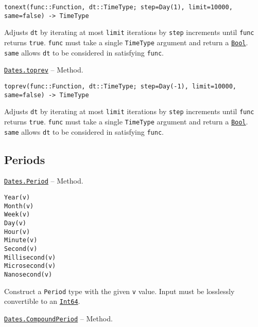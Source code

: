 \begin{adjustwidth}{2em}{0pt}


\begin{verbatim}
tonext(func::Function, dt::TimeType; step=Day(1), limit=10000, same=false) -> TimeType
\end{verbatim}

Adjusts \texttt{dt} by iterating at most \texttt{limit} iterations by \texttt{step} increments until \texttt{func} returns \texttt{true}. \texttt{func} must take a single \texttt{TimeType} argument and return a \hyperlink{46725311238864537}{\texttt{Bool}}. \texttt{same} allows \texttt{dt} to be considered in satisfying \texttt{func}.



\end{adjustwidth}
\hypertarget{7889720794479911439}{} 
\hyperlink{7889720794479911439}{\texttt{Dates.toprev}}  -- {Method.}

\begin{adjustwidth}{2em}{0pt}


\begin{verbatim}
toprev(func::Function, dt::TimeType; step=Day(-1), limit=10000, same=false) -> TimeType
\end{verbatim}

Adjusts \texttt{dt} by iterating at most \texttt{limit} iterations by \texttt{step} increments until \texttt{func} returns \texttt{true}. \texttt{func} must take a single \texttt{TimeType} argument and return a \hyperlink{46725311238864537}{\texttt{Bool}}. \texttt{same} allows \texttt{dt} to be considered in satisfying \texttt{func}.



\end{adjustwidth}

\hypertarget{5161625535326415321}{}


\subsection{Periods}


\hypertarget{5339072836021258931}{} 
\hyperlink{5339072836021258931}{\texttt{Dates.Period}}  -- {Method.}

\begin{adjustwidth}{2em}{0pt}


\begin{verbatim}
Year(v)
Month(v)
Week(v)
Day(v)
Hour(v)
Minute(v)
Second(v)
Millisecond(v)
Microsecond(v)
Nanosecond(v)
\end{verbatim}

Construct a \texttt{Period} type with the given \texttt{v} value. Input must be losslessly convertible to an \hyperlink{7720564657383125058}{\texttt{Int64}}.



\end{adjustwidth}
\hypertarget{6206546217215430454}{} 
\hyperlink{6206546217215430454}{\texttt{Dates.CompoundPeriod}}  -- {Method.}

